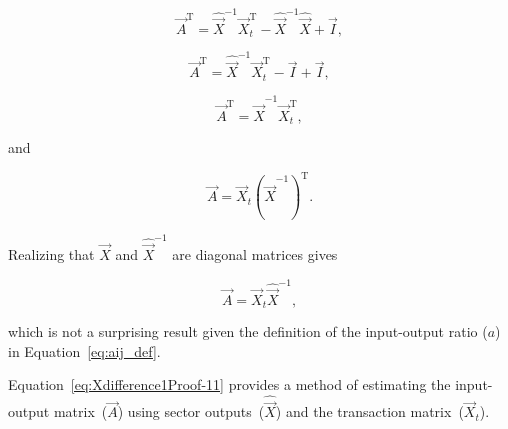 \begin{equation}\label{eq:Xdifference1Proof-7}
	\vec{A}^\mathrm{T} 
	= \hat{\vec{X}}^{-1} \vec{X}_{t}^\mathrm{T} 
	- \hat{\vec{X}}^{-1} \hat{\vec{X}}
	+ \vec{I},	
\end{equation}

\begin{equation}\label{eq:Xdifference1Proof-8}
	\vec{A}^\mathrm{T} 
	= \hat{\vec{X}}^{-1} \vec{X}_{t}^\mathrm{T} 
	- \vec{I}
	+ \vec{I},	
\end{equation}

\begin{equation}\label{eq:Xdifference1Proof-9}
	\vec{A}^\mathrm{T} 
	= \hat{\vec{X}}^{-1} 
	\vec{X}_{t}^\mathrm{T},
\end{equation}

\noindent{}and

\begin{equation}\label{eq:Xdifference1Proof-10}
	\vec{A} 
	= \vec{X}_{t}
	\left( {\hat{\vec{X}}^{-1}} \right) ^\mathrm{T}.
\end{equation}

\noindent{}Realizing that $\hat{\vec{X}}$ and $\hat{\vec{X}}^{-1}$
are diagonal matrices gives

\begin{equation}\label{eq:Xdifference1Proof-11}
	\vec{A} 
	= \vec{X}_{t}
	\hat{\vec{X}}^{-1},
\end{equation}

\noindent{}which is not a surprising result 
given the definition of the input-output ratio ($a$) in Equation~\ref{eq:aij_def}.

Equation~\ref{eq:Xdifference1Proof-11} provides a method 
of estimating the input-output matrix~($\vec{A}$) using
sector outputs~($\hat{\vec{X}}$) and the transaction matrix~($\vec{X}_{t}$).



